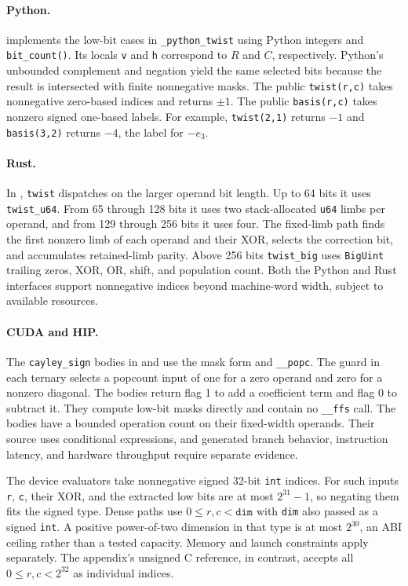 \documentclass[11pt]{article}
\begin{document}
\paragraph{Python.}
 implements the low-bit cases in
\texttt{\_python\_twist} using Python integers and \texttt{bit\_count()}.
Its locals \texttt{v} and \texttt{h} correspond to \(R\) and \(C\),
respectively. Python's unbounded complement and negation yield the same
selected bits because the result is intersected with finite nonnegative
masks. The public \texttt{twist(r,c)} takes nonnegative zero-based
indices and returns \(\pm1\). The public \texttt{basis(r,c)} takes
nonzero signed one-based labels. For example, \texttt{twist(2,1)}
returns \(-1\) and \texttt{basis(3,2)} returns \(-4\), the label
for \(-e_3\).

\paragraph{Rust.}
In , \texttt{twist} dispatches on the
larger operand bit length. Up to 64 bits it uses \texttt{twist\_u64}.
From 65 through 128 bits it uses two stack-allocated \texttt{u64}
limbs per operand, and from 129 through 256 bits it uses four.
The fixed-limb path finds the first nonzero limb of each operand and
their XOR, selects the correction bit, and accumulates retained-limb
parity. Above 256 bits \texttt{twist\_big} uses \texttt{BigUint}
trailing zeros, XOR, OR, shift, and population count. Both the Python
and Rust interfaces support nonnegative indices beyond machine-word
width, subject to available resources.

\paragraph{CUDA and HIP.}
The \texttt{cayley\_sign} bodies in  and
 use the mask form and \texttt{\_\_popc}.
The guard in each ternary selects a popcount input of one for a zero
operand and zero for a nonzero diagonal. The bodies return flag 1 to
add a coefficient term and flag 0 to subtract it. They compute low-bit
masks directly and contain no \texttt{\_\_ffs} call. The bodies have
a bounded operation count on their fixed-width operands. Their source
uses conditional expressions, and generated branch behavior, instruction
latency, and hardware throughput require separate evidence.

The device evaluators take nonnegative signed 32-bit \texttt{int}
indices. For such inputs \texttt{r}, \texttt{c}, their XOR, and
the extracted low bits are at most \(2^{31}-1\), so negating them
fits the signed type. Dense paths use \(0\leq r,c<\texttt{dim}\)
with \texttt{dim} also passed as a signed \texttt{int}. A positive
power-of-two dimension in that type is at most \(2^{30}\), an ABI
ceiling rather than a tested capacity. Memory and launch constraints
apply separately. The appendix's unsigned C reference, in contrast,
accepts all \(0\leq r,c<2^{32}\) as individual indices.
\end{document}
